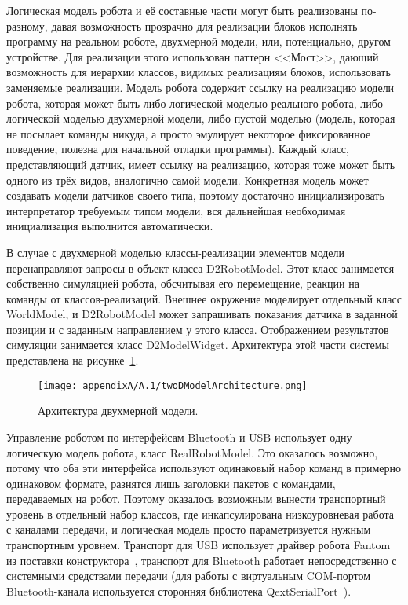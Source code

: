 Логическая модель робота и её составные части могут быть реализованы по-разному, давая 
возможность прозрачно для реализации блоков исполнять программу на реальном роботе, 
двухмерной модели, или, потенциально, другом устройстве. Для реализации этого использован 
паттерн <<Мост>>, дающий возможность для иерархии классов, видимых реализациям блоков, 
использовать заменяемые реализации. Модель робота содержит ссылку на реализацию модели 
робота, которая может быть либо логической моделью реального робота, либо логической 
моделью двухмерной модели, либо пустой моделью (модель, которая не посылает команды 
никуда, а просто эмулирует некоторое фиксированное поведение, полезна для начальной 
отладки программы). Каждый класс, представляющий датчик, имеет ссылку на реализацию, 
которая тоже может быть одного из трёх видов, аналогично самой модели. Конкретная 
модель может создавать модели датчиков своего типа, поэтому достаточно инициализировать 
интерпретатор требуемым типом модели, вся дальнейшая необходимая инициализация выполнится 
автоматически.

В случае с двухмерной моделью классы-реализации элементов модели перенаправляют запросы 
в объект класса D2RobotModel. Этот класс занимается собственно симуляцией робота, 
обсчитывая его перемещение, реакции на команды от классов-реализаций. Внешнее окружение 
моделирует отдельный класс WorldModel, и D2RobotModel может запрашивать показания 
датчика в заданной позиции и с заданным направлением у этого класса. Отображением 
результатов симуляции занимается класс D2ModelWidget. Архитектура этой части системы 
представлена на рисунке~\ref{image:twoDModelArchitecture}.

\begin{figure} [ht]
	\begin{center}
		\texttt{[image: appendixA/A.1/twoDModelArchitecture.png]}
		\caption{Архитектура двухмерной модели.}
		\label{image:twoDModelArchitecture}
	\end{center}
\end{figure}

Управление роботом по интерфейсам Bluetooth и USB использует одну логическую модель 
робота, класс RealRobotModel. Это оказалось возможно, потому что оба эти интерфейса 
используют одинаковый набор команд в примерно одинаковом формате, разнятся лишь заголовки 
пакетов с командами, передаваемых на робот. Поэтому оказалось возможным вынести транспортный 
уровень в отдельный набор классов, где инкапсулирована низкоуровневая работа с каналами 
передачи, и логическая модель просто параметризуется нужным транспортным уровнем. 
Транспорт для USB использует драйвер робота Fantom из поставки конструктора~\cite{fantom}, 
транспорт для Bluetooth работает непосредственно с системными средствами передачи 
(для работы с виртуальным COM-портом Bluetooth-канала используется сторонняя библиотека 
QextSerialPort~\cite{qextSerialPort}).

